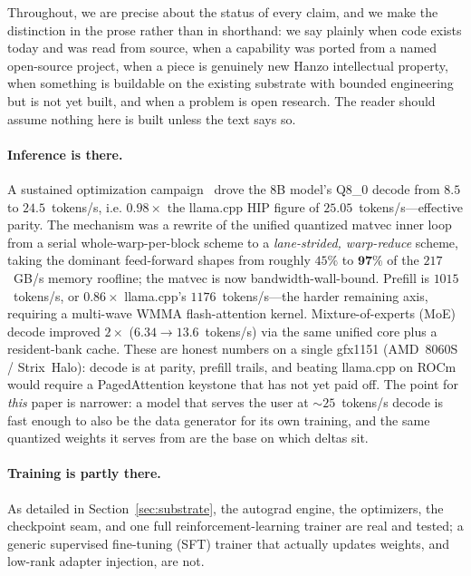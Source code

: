 \documentclass[11pt]{article}
\begin{document}
Throughout, we are precise about the status of every claim, and we make the distinction in the prose rather than in shorthand: we say plainly when code exists today and was read from source, when a capability was ported from a named open-source project, when a piece is genuinely new Hanzo intellectual property, when something is buildable on the existing substrate with bounded engineering but is not yet built, and when a problem is open research. The reader should assume nothing here is built unless the text says so.

\paragraph{Inference is there.}
A sustained optimization campaign~\cite{hanzorocm} drove the 8B model's Q8\_0 decode from $8.5$ to $\mathbf{24.5}$~tokens/s, i.e. $0.98\times$ the llama.cpp HIP figure of $25.05$~tokens/s---effective parity. The mechanism was a rewrite of the unified quantized matvec inner loop from a serial whole-warp-per-block scheme to a \emph{lane-strided, warp-reduce} scheme, taking the dominant feed-forward shapes from roughly $45\%$ to $\mathbf{97\%}$ of the $217$~GB/s memory roofline; the matvec is now bandwidth-wall-bound. Prefill is $1015$~tokens/s, or $0.86\times$ llama.cpp's $1176$~tokens/s---the harder remaining axis, requiring a multi-wave WMMA flash-attention kernel. Mixture-of-experts (MoE) decode improved $2\times$ ($6.34 \to 13.6$~tokens/s) via the same unified core plus a resident-bank cache. These are honest numbers on a single gfx1151 (AMD~8060S / Strix~Halo): decode is at parity, prefill trails, and beating llama.cpp on ROCm would require a PagedAttention keystone that has not yet paid off. The point for \emph{this} paper is narrower: a model that serves the user at $\sim$$25$~tokens/s decode is fast enough to also be the data generator for its own training, and the same quantized weights it serves from are the base on which deltas sit.

\paragraph{Training is partly there.}
As detailed in Section~\ref{sec:substrate}, the autograd engine, the optimizers, the checkpoint seam, and one full reinforcement-learning trainer are real and tested; a generic supervised fine-tuning (SFT) trainer that actually updates weights, and low-rank adapter injection, are not.
\end{document}
